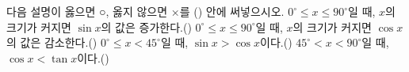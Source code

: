다음 설명이 옳으면 ○, 옳지 않으면 ×를 (\quad) 안에 써넣으시오.
 $0^\circ\le x\le 90^\circ$일 때, $x$의 크기가 커지면 $\sin x$의 값은 증가한다.\nobreak\hfill\mbox{(\qquad)}
 $0^\circ\le x\le 90^\circ$일 때, $x$의 크기가 커지면 $\cos x$의 값은 감소한다.\nobreak\hfill\mbox{(\qquad)}
 $0^\circ\le x<45^\circ$일 때, $\sin x>\cos x$이다.\nobreak\hfill\mbox{(\qquad)}
 $45^\circ<x<90^\circ$일 때, $\cos x<\tan x$이다.\nobreak\hfill\mbox{(\qquad)}
